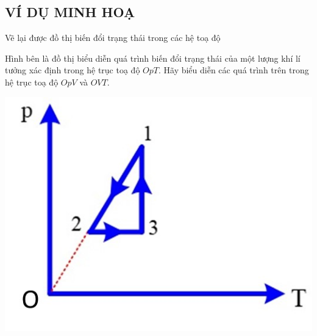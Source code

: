 \subsection{VÍ DỤ MINH HOẠ}
\begin{dang}{Vẽ lại được đồ thị biến đổi trạng thái trong các hệ toạ độ}
	\end{dang}
\begin{vd}
	Hình bên là đồ thị biểu diễn quá trình biến đổi trạng thái của một lượng khí lí tưởng xác định trong hệ trục toạ độ $OpT$. Hãy biểu diễn các quá trình trên trong hệ trục toạ độ $OpV$ và $OVT$.
		\begin{center}
			\includegraphics[width=0.25\linewidth]{figs/VN12-Y24-PH-SYL-014-2}
		\end{center}
\end{vd}

